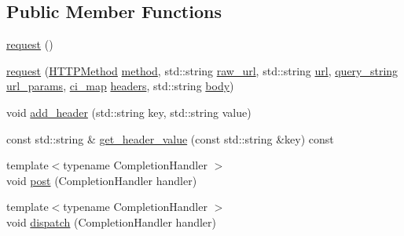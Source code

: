 \subsection*{Public Member Functions}
\begin{DoxyCompactItemize}
\item 
\hyperlink{structcrow_1_1request_a838c9a8c9a5eb2283d57e66f3630b5a6}{request} ()
\item 
\hyperlink{structcrow_1_1request_a59648d32ef18fa5ef59509a6def80ddc}{request} (\hyperlink{namespacecrow_a02d34072d2b3415aee5e7287edd06ae1}{H\-T\-T\-P\-Method} \hyperlink{structcrow_1_1request_a79ac893dd6ad4ec5752dea0cec65ce71}{method}, std\-::string \hyperlink{structcrow_1_1request_a72f5504a56f9ba70d7d33f86aaf9bc8a}{raw\-\_\-url}, std\-::string \hyperlink{structcrow_1_1request_aa3df34c56847d6d42887e73655276167}{url}, \hyperlink{classcrow_1_1query__string}{query\-\_\-string} \hyperlink{structcrow_1_1request_a745d5a94e9e9ae1fed64674aae0194b0}{url\-\_\-params}, \hyperlink{namespacecrow_a9090432313cd58380727a6c4384ee792}{ci\-\_\-map} \hyperlink{structcrow_1_1request_a86d6c2a93b50611c4a5b5643b6da6540}{headers}, std\-::string \hyperlink{structcrow_1_1request_afff683ed63a9e4067683786c3c6218c2}{body})
\item 
void \hyperlink{structcrow_1_1request_a98b85749921fc63e57d6ea891fe17391}{add\-\_\-header} (std\-::string key, std\-::string value)
\item 
const std\-::string \& \hyperlink{structcrow_1_1request_ab7b219512fa6db3bffa6c102ad4b6044}{get\-\_\-header\-\_\-value} (const std\-::string \&key) const 
\item 
{\footnotesize template$<$typename Completion\-Handler $>$ }\\void \hyperlink{structcrow_1_1request_a33aa146a3914864ce82ef22136451601}{post} (Completion\-Handler handler)
\item 
{\footnotesize template$<$typename Completion\-Handler $>$ }\\void \hyperlink{structcrow_1_1request_ac3e72e3fe415c68618dee999e3984160}{dispatch} (Completion\-Handler handler)
\end{DoxyCompactItemize}
